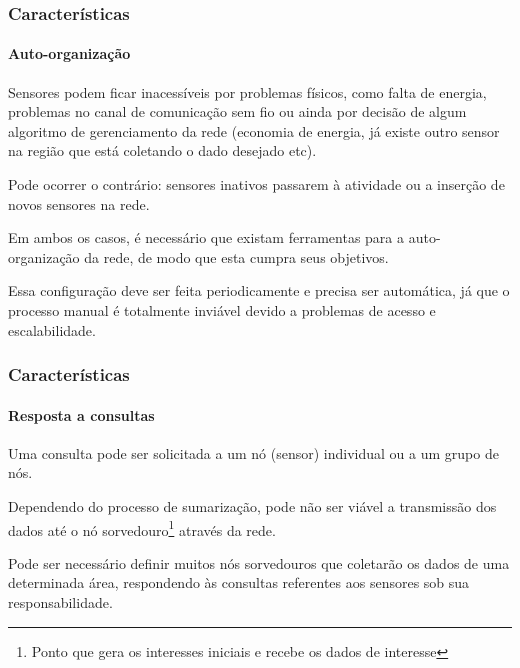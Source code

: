 \documentclass[notes]{beamer}
\begin{document}
\begin{frame}
\frametitle{Características}
\framesubtitle{Auto-organização}

\begin{block}

Sensores podem ficar inacessíveis por problemas físicos, como falta de energia, problemas no canal de comunicação sem fio ou ainda por decisão de algum algoritmo de gerenciamento da rede (economia de energia, já existe outro sensor na região que está coletando o dado desejado etc). 

\end{block} \pause

\begin{block}

Pode ocorrer o contrário: sensores inativos passarem à atividade ou a inserção de novos sensores na rede. 
\end{block} \pause

\begin{block}

Em ambos os casos, é necessário que existam ferramentas para a auto-organização da rede, de modo que esta cumpra seus objetivos.

\end{block} \pause

\begin{alertblock}

Essa configuração deve ser feita periodicamente e precisa ser automática, já que o processo manual é totalmente inviável devido a problemas de acesso e escalabilidade. 
\end{alertblock}

\end{frame}

\begin{frame}
\frametitle{Características}
\framesubtitle{Resposta a consultas}

\begin{block}

Uma consulta pode ser solicitada a um nó (sensor) individual ou a um grupo de nós.

\end{block} \pause

\begin{block}

Dependendo do processo de sumarização, pode não ser viável a transmissão dos dados até o nó sorvedouro\footnote{Ponto que gera os interesses iniciais e recebe os dados de interesse} através da rede. 
\end{block} \pause

\begin{block}

Pode ser necessário definir muitos nós sorvedouros que coletarão os dados de uma determinada área, respondendo às consultas referentes aos sensores sob sua responsabilidade.
\end{block} 

\end{frame}
\end{document}
